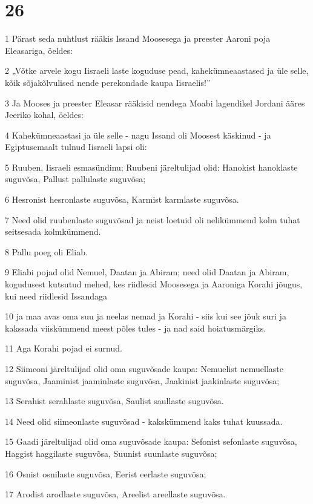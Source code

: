 \chapter{26}

\par 1 Pärast seda nuhtlust rääkis Issand Moosesega ja preester Aaroni poja Eleasariga, öeldes:
\par 2 „Võtke arvele kogu Iisraeli laste koguduse pead, kahekümneaastased ja üle selle, kõik sõjakõlvulised nende perekondade kaupa Iisraelis!”
\par 3 Ja Mooses ja preester Eleasar rääkisid nendega Moabi lagendikel Jordani ääres Jeeriko kohal, öeldes:
\par 4 Kahekümneaastasi ja üle selle - nagu Issand oli Moosest käskinud - ja Egiptusemaalt tulnud Iisraeli lapsi oli:
\par 5 Ruuben, Iisraeli esmasündinu; Ruubeni järeltulijad olid: Hanokist hanoklaste suguvõsa, Pallust pallulaste suguvõsa;
\par 6 Hesronist hesronlaste suguvõsa, Karmist karmlaste suguvõsa.
\par 7 Need olid ruubenlaste suguvõsad ja neist loetuid oli nelikümmend kolm tuhat seitsesada kolmkümmend.
\par 8 Pallu poeg oli Eliab.
\par 9 Eliabi pojad olid Nemuel, Daatan ja Abiram; need olid Daatan ja Abiram, kogudusest kutsutud mehed, kes riidlesid Moosesega ja Aaroniga Korahi jõugus, kui need riidlesid Issandaga
\par 10 ja maa avas oma suu ja neelas nemad ja Korahi - siis kui see jõuk suri ja kakssada viiskümmend meest põles tules - ja nad said hoiatusmärgiks.
\par 11 Aga Korahi pojad ei surnud.
\par 12 Siimeoni järeltulijad olid oma suguvõsade kaupa: Nemuelist nemuellaste suguvõsa, Jaaminist jaaminlaste suguvõsa, Jaakinist jaakinlaste suguvõsa;
\par 13 Serahist serahlaste suguvõsa, Saulist saullaste suguvõsa.
\par 14 Need olid siimeonlaste suguvõsad - kakskümmend kaks tuhat kuussada.
\par 15 Gaadi järeltulijad olid oma suguvõsade kaupa: Sefonist sefonlaste suguvõsa, Haggist haggilaste suguvõsa, Suunist suunlaste suguvõsa;
\par 16 Osnist osnilaste suguvõsa, Eerist eerlaste suguvõsa;
\par 17 Arodist arodlaste suguvõsa, Areelist areellaste suguvõsa.
